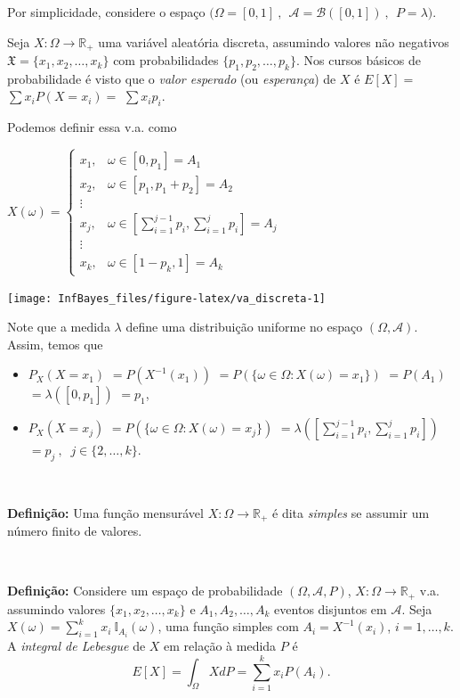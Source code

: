 \documentclass[
]{book}
\begin{document}
Por simplicidade, considere o espaço \(\Big(\Omega = [0,1]~,~~ \mathcal{A} = \mathcal{B}\left([0,1]\right)~,~~ P=\lambda\Big)\).

Seja \(X: \Omega \longrightarrow \mathbb{R}_+\) uma variável aleatória discreta, assumindo valores não negativos \(\mathfrak{X}=\{x_1,x_2,\ldots,x_k\}\) com probabilidades \(\{p_1,p_2,\ldots,p_k\}\). Nos cursos básicos de probabilidade é visto que o \emph{valor esperado} (ou \emph{esperança}) de \(X\) é \(E[X] =\) \(\sum x_i P(X=x_i) =\) \(\sum x_i p_i\).

Podemos definir essa v.a. como

\(X(\omega) = \left\{\begin{array}{ll} x_1, & \omega \in [0,p_1] = A_1 \\  x_2, & \omega \in [p_1,p_1+p_2] = A_2 \\  \vdots & \\  x_j, & \omega \in \left[\displaystyle\sum_{i=1}^{j-1} p_i,\sum_{i=1}^{j} p_i\right] = A_j \\  \vdots & \\  x_k, & \omega \in [1-p_k,1] = A_k \end{array}\right.\)

\begin{center}\texttt{[image: InfBayes\_files/figure-latex/va\_discreta-1]} \end{center}

Note que a medida \(\lambda\) define uma distribuição uniforme no espaço \((\Omega,\mathcal{A})\). Assim, temos que

\begin{itemize}
\item
  \(P_X(X=x_1)\) \(=P\left(X^{-1}(x_1)\right)\) \(=P\left(\{\omega \in \Omega : X(\omega)=x_1\}\right)\) \(=P(A_1)\) \(=\lambda\left([0,p_1]\right)\) \(=p_1\),
\item
  \(P_X(X=x_j)\) \(=P\left(\{\omega \in \Omega : X(\omega)=x_j\}\right)\) \(=\lambda\left(\left[\sum_{i=1}^{j-1} p_i,\sum_{i=1}^{j} p_i\right]\right)\) \(=p_j ~,~\) \(j \in \{2,\ldots,k\}\).
\end{itemize}

\(~\)

\textbf{Definição:} Uma função mensurável \(X: \Omega \longrightarrow \mathbb{R}_+\) é dita \emph{simples} se assumir um número finito de valores.

\(~\)

\textbf{Definição:} Considere um espaço de probabilidade \((\Omega, \mathcal{A}, P)\), \(X:\Omega\longrightarrow \mathbb{R}_+\) v.a. assumindo valores \(\{x_1,x_2,\ldots,x_k\}\) e \(A_1,A_2,\ldots,A_k\) eventos disjuntos em \(\mathcal{A}\). Seja \(\displaystyle X(\omega) = \sum_{i=1}^{k} x_i ~\mathbb{I}_{A_i}(\omega)\), uma função simples com \(A_i = X^{-1}(x_i)\), \(i=1,\ldots,k\). A \emph{integral de Lebesgue} de \(X\) em relação à medida \(P\) é
\[E[X] = \int_\Omega X dP = \sum_{i=1}^{k} x_i P(A_i).\]
\end{document}
